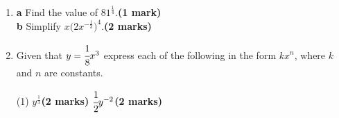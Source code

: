 \documentclass[fleqn]{article}
\begin{document}
\begin{enumerate}
    \item \hspace*{2mm}\textbf{a}\hspace*{5mm} Find the value of $81^{\textstyle\frac{1}{4}}$.\hfill\textbf{(1 mark)}\vspace{1mm}\\
          \hspace*{2mm}\textbf{b}\hspace*{5mm} Simplify $x\Big(2x^{-\textstyle\frac{1}{3}}\Big)^4$.\hfill\textbf{(2 marks)}
    \item Given that $y=\cfrac{1}{8}x^3$ express each of the following in the form $kx^n$, where $k$ and $n$ are constants.\vspace{-2mm}
        \begin{tasks}(1)
            \task $y^{\textstyle\frac{1}{3}}$\hfill\textbf{(2 marks)}\vspace{-1mm}
            \task $\cfrac{1}{2}y^{-2}$\hfill\textbf{(2 marks)}
        \end{tasks}
\end{enumerate}
\end{document}
